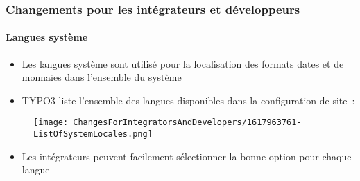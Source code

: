 %

\begin{frame}[fragile]
	\frametitle{Changements pour les intégrateurs et développeurs}
	\framesubtitle{Langues système}

	\begin{itemize}
		\item Les langues système sont utilisé pour la localisation des formats dates et de monnaies dans l'ensemble du système
		\item TYPO3 liste l'ensemble des langues disponibles dans la configuration de site~:
	\end{itemize}

	\begin{figure}
		\texttt{[image: ChangesForIntegratorsAndDevelopers/1617963761-ListOfSystemLocales.png]}
	\end{figure}

	\begin{itemize}
		\item Les intégrateurs peuvent facilement sélectionner la bonne option pour chaque langue
	\end{itemize}

\end{frame}

